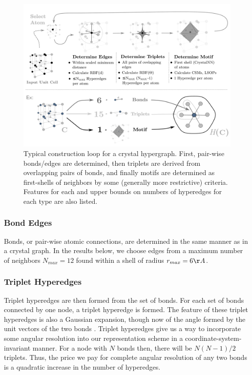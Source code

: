 \documentclass[10pt,a4paper,twocolumn]{article}
\begin{document}
\begin{figure}[!ht]
	\centering
	\includegraphics[scale=0.31]{crystal_hgraph_ex+revamp3.pdf}
	\caption{Typical construction loop for a crystal hypergraph. First, pair-wise bonds/edges are determined, then triplets are derived from overlapping pairs of bonds, and finally motifs are determined as first-shells of neighbors by some (generally more restrictive) criteria. Features for each and upper bounds on numbers of hyperedges for each type are also listed.}
	\label{fig:hypergraph-loop}
\end{figure}

\subsubsection{Bond Edges}
Bonds, or pair-wise atomic connections, are determined in the same manner as in a crystal graph. In the results below, we choose edges from a maximum number of neighbors $N_{max}=12$ found within a shell of radius $r_{max}=6\AA$. 

\subsubsection{Triplet Hyperedges}
Triplet hyperedges are then formed from the set of bonds. For each set of bonds connected by one node, a triplet hyperedge is formed. The feature of these triplet hyperedges is also a Gaussian expansion, though now of the angle formed by the unit vectors of the two bonds \cite{alignn}.
Triplet hyperedges give us a way to incorporate some angular resolution into our representation scheme in a coordinate-system-invariant manner.
For a node with $N$ bonds then, there will be $N(N-1)/2$ triplets. Thus, the price we pay for complete angular resolution of any two bonds is a quadratic increase in the number of hyperedges.
\end{document}
